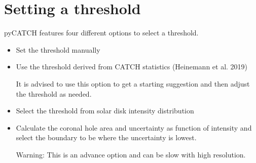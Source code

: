 \documentclass[letterpaper,10pt,english]{sphinxmanual}
\begin{document}
\section{Setting a threshold}
\label{\detokenize{getting_started:setting-a-threshold}}
\sphinxAtStartPar
pyCATCH features four different options to select a threshold.
\begin{itemize}
\item {} 
\sphinxAtStartPar
Set the threshold manually

\begin{sphinxVerbatim}[commandchars=\\\{\}]
\end{sphinxVerbatim}

\item {} 
\sphinxAtStartPar
Use the threshold derived from CATCH statistics (Heinemann et al. 2019)

\begin{sphinxVerbatim}[commandchars=\\\{\}]
\end{sphinxVerbatim}

\sphinxAtStartPar
It is advised to use this option to get a starting suggestion and then adjust the threshold as needed.

\item {} 
\sphinxAtStartPar
Select the threshold from solar disk intensity distribution

\begin{sphinxVerbatim}[commandchars=\\\{\}]
\end{sphinxVerbatim}

\item {} 
\sphinxAtStartPar
Calculate the coronal hole area and uncertainty as function of intensity and select the boundary to be where the uncertainty is lowest.

\begin{sphinxVerbatim}[commandchars=\\\{\}]
\end{sphinxVerbatim}

\sphinxAtStartPar
Warning: This is an advance option and can be slow with high resolution.

\end{itemize}
\end{document}
